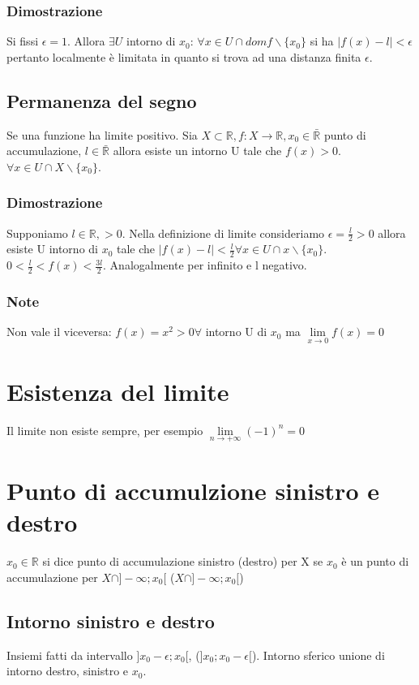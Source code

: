 \subsubsection{Dimostrazione}
Si fissi $\epsilon=1$. Allora $\exists U$ intorno di $x_0$: $\forall x\in U\cap domf\backslash\{x_0\}$ si ha $|f(x)-l|<\epsilon$ pertanto localmente \`e limitata in quanto
si trova ad una distanza finita $\epsilon$.
\subsection{Permanenza del segno}
Se una funzione ha limite positivo.
Sia $X\subset\mathbb{R}, f:X\rightarrow\mathbb{R}, x_0\in\bar{\mathbb{R}}$ punto di accumulazione, $l\in\bar{\mathbb{R}}$ allora esiste un intorno U tale che $f(x)>0$.
$\forall x\in U\cap X\backslash\{x_0\}$.
\subsubsection{Dimostrazione}
Supponiamo $l\in\mathbb{R},>0$. Nella definizione di limite consideriamo $\epsilon=\frac{l}{2}>0$ allora esiste U intorno di $x_0$ tale che $|f(x)-l|<\frac{l}{2}\forall x\in U\cap x\backslash\{x_0\}$. $0<\frac{l}{2}<f(x)<\frac{3l}{2}$.
Analogalmente per infinito e l negativo.
\subsubsection{Note}
Non vale il viceversa: $f(x)=x^2>0 \forall$ intorno U di $x_0$ ma $\lim\limits_{x\rightarrow 0} f(x)=0$
\section{Esistenza del limite}
Il limite non esiste sempre, per esempio $\lim\limits_{n\rightarrow +\infty} (-1)^n=0$
\section{Punto di accumulzione sinistro e destro}
$x_0\in\mathbb{R}$ si dice punto di accumulazione sinistro (destro) per X se $x_0$ \`e un punto di accumulazione per $X\cap]-\infty;x_0[$ ($X\cap]-\infty;x_0[$)
\subsection{Intorno sinistro e destro}
Insiemi fatti da intervallo $]x_0-\epsilon;x_0[$, ($]x_0;x_0-\epsilon[$). Intorno sferico unione di intorno destro, sinistro e $x_0$.
